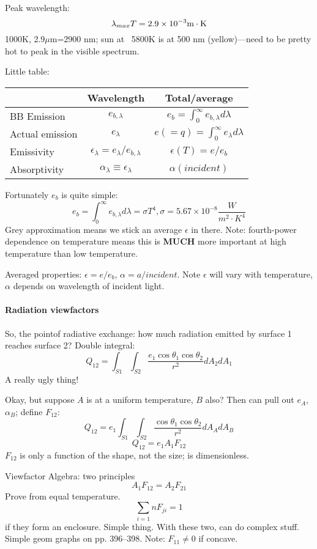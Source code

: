 \documentclass{report}
\begin{document}
Peak wavelength:
$$\lambda_{max} T = 2.9\times10^{-3}{\rm m\cdot K}$$
1000K, 2.9$\mu$m=2900 nm; sun at ~5800K is at 500 nm (yellow)---need to be
pretty hot to peak in the visible spectrum.

Little table:
\begin{center}
  \begin{tabular}{l|c|c|}
                    & Wavelength & Total/average    \\ \hline
    BB Emission     & $e_{b,\lambda}$ & $e_b=\int_0^\infty e_{b,\lambda}d\lambda$ \\
    Actual emission & $e_\lambda$     & $e(=q)=\int_0^\infty e_\lambda d\lambda$ \\
    Emissivity      & $\epsilon_\lambda=e_\lambda/e_{b,\lambda}$ & $\epsilon(T)=e/e_b$ \\
    Absorptivity    & $\alpha_\lambda\equiv \epsilon_\lambda$ & $\alpha(incident)$ \\ \hline
  \end{tabular}
\end{center}

Fortunately $e_b$ is quite simple:
$$e_b = \int_0^\infty e_{b,\lambda} d\lambda = \sigma T^4,
\sigma = 5.67\times10^{-8}\frac{W}{m^2\cdot K^4}$$
Grey approximation means we stick an average $\epsilon$ in there.  Note:
fourth-power dependence on temperature means this is {\bf MUCH} more important
at high temperature than low temperature.

Averaged properties: $\epsilon=e/e_b$, $\alpha=a/incident$.  Note $\epsilon$
will vary with temperature, $\alpha$ depends on wavelength of incident light.

\paragraph{Radiation viewfactors}

So, the pointof radiative exchange: how much radiation emitted by surface 1
reaches surface 2?  Double integral:
$$Q_{12} = \int_{S1} \int_{S2} \frac{e_1 \cos\theta_1 \cos\theta_2}
{r^2} dA_2 dA_1$$
A really ugly thing!

Okay, but suppose $A$ is at a uniform temperature, $B$ also?  Then can pull out
$e_A$, $\alpha_B$; define $F_{12}$:
$$Q_{12} = e_1 \int_{S1} \int_{S2} \frac{\cos\theta_1 \cos\theta_2}
{r^2} dA_A dA_B$$
$$Q_{12} = e_1 A_1 F_{12}$$
$F_{12}$ is only a function of the shape, not the size; is dimensionless.

Viewfactor Algebra: two principles
$$A_1 F_{12} = A_2 F_{21}$$
Prove from equal temperature.
$$\sum_{i=1}{n} F_{ji} = 1$$
if they form an enclosure.  Simple thing.  With these two, can do complex
stuff.  Simple geom graphs on pp. 396--398.  Note: $F_{11}\neq 0$ if concave.
\end{document}
